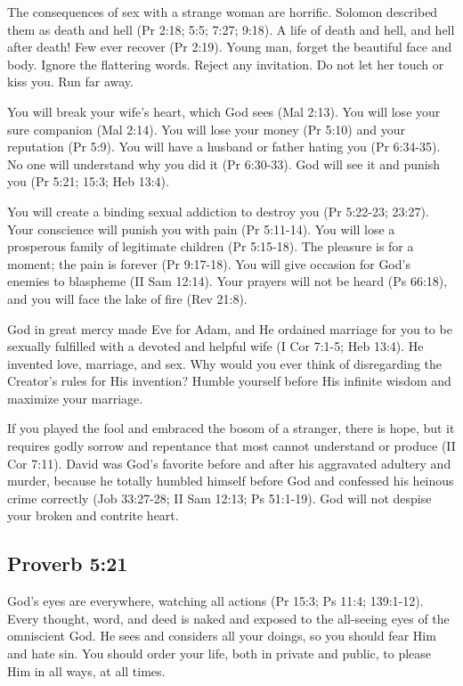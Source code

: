 The consequences of sex with a strange woman are horrific. Solomon described them as death and hell (Pr 2:18; 5:5; 7:27; 9:18). A life of death and hell, and hell after death! Few ever recover (Pr 2:19). Young man, forget the beautiful face and body. Ignore the flattering words. Reject any invitation. Do not let her touch or kiss you. Run far away.

You will break your wife’s heart, which God sees (Mal 2:13). You will lose your sure companion (Mal 2:14). You will lose your money (Pr 5:10) and your reputation (Pr 5:9). You will have a husband or father hating you (Pr 6:34-35). No one will understand why you did it (Pr 6:30-33). God will see it and punish you (Pr 5:21; 15:3; Heb 13:4).

You will create a binding sexual addiction to destroy you (Pr 5:22-23; 23:27). Your conscience will punish you with pain (Pr 5:11-14). You will lose a prosperous family of legitimate children (Pr 5:15-18). The pleasure is for a moment; the pain is forever (Pr 9:17-18). You will give occasion for God’s enemies to blaspheme (II Sam 12:14). Your prayers will not be heard (Ps 66:18), and you will face the lake of fire (Rev 21:8).

God in great mercy made Eve for Adam, and He ordained marriage for you to be sexually fulfilled with a devoted and helpful wife (I Cor 7:1-5; Heb 13:4). He invented love, marriage, and sex. Why would you ever think of disregarding the Creator’s rules for His invention? Humble yourself before His infinite wisdom and maximize your marriage.

If you played the fool and embraced the bosom of a stranger, there is hope, but it requires godly sorrow and repentance that most cannot understand or produce (II Cor 7:11). David was God’s favorite before and after his aggravated adultery and murder, because he totally humbled himself before God and confessed his heinous crime correctly (Job 33:27-28; II Sam 12:13; Ps 51:1-19). God will not despise your broken and contrite heart.

\subsection{Proverb 5:21}
God’s eyes are everywhere, watching all actions (Pr 15:3; Ps 11:4; 139:1-12). Every thought, word, and deed is naked and exposed to the all-seeing eyes of the omniscient God. He sees and considers all your doings, so you should fear Him and hate sin. You should order your life, both in private and public, to please Him in all ways, at all times.

